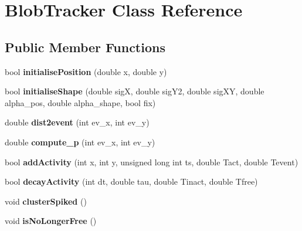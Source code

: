 \hypertarget{classBlobTracker}{}\section{Blob\+Tracker Class Reference}
\label{classBlobTracker}
\subsection*{Public Member Functions}
\begin{DoxyCompactItemize}
\item 
bool {\bfseries initialise\+Position} (double x, double y)\hypertarget{classBlobTracker_ac3dbde755642d5e9cf179123823a8eec}{}\label{classBlobTracker_ac3dbde755642d5e9cf179123823a8eec}

\item 
bool {\bfseries initialise\+Shape} (double sigX, double sig\+Y2, double sig\+XY, double alpha\+\_\+pos, double alpha\+\_\+shape, bool fix)\hypertarget{classBlobTracker_a29990e53b163a720f284978b97a6d723}{}\label{classBlobTracker_a29990e53b163a720f284978b97a6d723}

\item 
double {\bfseries dist2event} (int ev\+\_\+x, int ev\+\_\+y)\hypertarget{classBlobTracker_a873c6f0932845537163a5b80605ac599}{}\label{classBlobTracker_a873c6f0932845537163a5b80605ac599}

\item 
double {\bfseries compute\+\_\+p} (int ev\+\_\+x, int ev\+\_\+y)\hypertarget{classBlobTracker_abfe11c1db8b5c9634ec9f5ba86f379d9}{}\label{classBlobTracker_abfe11c1db8b5c9634ec9f5ba86f379d9}

\item 
bool {\bfseries add\+Activity} (int x, int y, unsigned long int ts, double Tact, double Tevent)\hypertarget{classBlobTracker_ab84953899ecee068e63a8f1a89fe7dd8}{}\label{classBlobTracker_ab84953899ecee068e63a8f1a89fe7dd8}

\item 
bool {\bfseries decay\+Activity} (int dt, double tau, double Tinact, double Tfree)\hypertarget{classBlobTracker_af410be534735ad33bafc259d70316a54}{}\label{classBlobTracker_af410be534735ad33bafc259d70316a54}

\item 
void {\bfseries cluster\+Spiked} ()\hypertarget{classBlobTracker_af7a07b561d9516ab480632667672e7ed}{}\label{classBlobTracker_af7a07b561d9516ab480632667672e7ed}

\item 
void {\bfseries is\+No\+Longer\+Free} ()\hypertarget{classBlobTracker_ad22b6a8aaf647e71b57fba25f9f419d1}{}\label{classBlobTracker_ad22b6a8aaf647e71b57fba25f9f419d1}


\end{DoxyCompactItemize}
